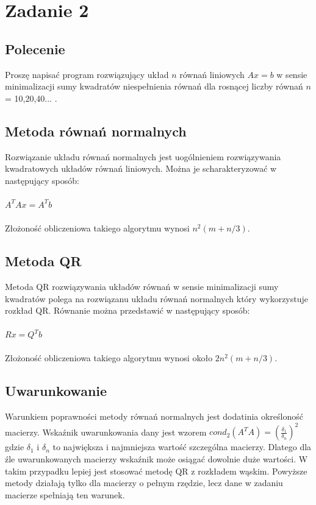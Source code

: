 \documentclass[a4paper, 11pt]{article}
\begin{document}
\section{Zadanie 2}

\subsection{Polecenie}
Proszę napisać program rozwiązujący układ $n$ równań liniowych $Ax = b$ w sensie minimalizacji sumy kwadratów niespełnienia równań dla rosnącej liczby równań $n$ = 10,20,40... .

\subsection{Metoda równań normalnych}
Rozwiązanie układu równań normalnych jest uogólnieniem rozwiązywania kwadratowych układów równań liniowych. Można je scharakteryzować w następujący sposób: 
\\
\\
$A^TAx = A^Tb$
\\
\\
Złożoność obliczeniowa takiego algorytmu wynosi $n^2(m+n/3)$. 

\subsection{Metoda QR}
Metoda QR rozwiązywania układów równań w sensie minimalizacji sumy kwadratów polega na rozwiązanu układu równań normalnych który wykorzystuje rozkład QR. Równanie można przedstawić w następujący sposób:
\\
\\
$Rx = Q^Tb$
\\
\\
Złożoność obliczeniowa takiego algorytmu wynosi około $2n^2(m+n/3)$. 


\subsection{Uwarunkowanie}
Warunkiem poprawności metody równań normalnych jest dodatinia określoność macierzy. Wskaźnik uwarunkowania dany jest wzorem 
$cond_{2}(A^TA) = (\frac{\delta_{1}}{\delta_{n}})^2$ gdzie $\delta_{1}$ i $\delta_{n}$ to największa i najmniejsza wartość szczególna macierzy. Dlatego dla źle uwarunkowanych macierzy wskaźnik może osiągać dowolnie duże wartości. W takim przypadku lepiej jest stosować metodę QR z rozkładem wąskim. Powyższe metody działają tylko dla macierzy o pełnym rzędzie, lecz dane w zadaniu macierze spełniają ten warunek. 
\end{document}
